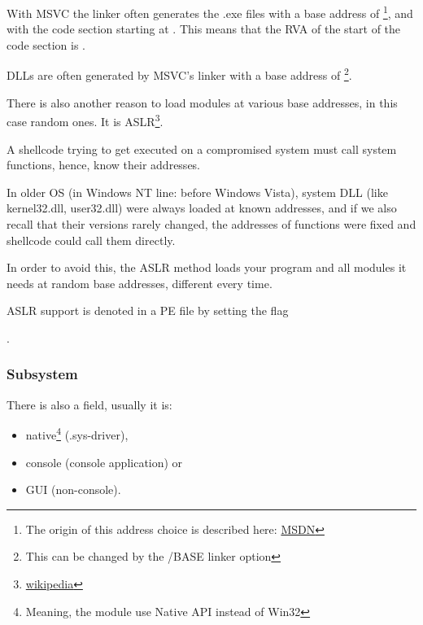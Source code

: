 \par With \ac{MSVC} the linker often generates the .exe files with a base address of 
\footnote{The origin of this address choice is described here: \href{http://go.yurichev.com/17041}{MSDN}},
and with the code section starting at .
This means that the \ac{RVA} of the start of the code section is .

DLLs are often generated by MSVC's linker with a base address of 
\footnote{This can be changed by the /BASE linker option}.


There is also another reason to load modules at various base addresses, in this case random ones.
It is \ac{ASLR}\footnote{\href{http://go.yurichev.com/17140}{wikipedia}}.


A shellcode trying to get executed on a compromised system must call system functions, hence, know their addresses.

In older \ac{OS} (in \gls{Windows NT} line: before Windows Vista),
system DLL (like kernel32.dll, user32.dll) were always loaded at known addresses, 
and if we also recall
that their versions rarely changed, the addresses of functions were
fixed and shellcode could call them directly.

In order to avoid this, the \ac{ASLR}
method loads your program and all modules it needs at random base addresses, different every time.

\ac{ASLR} support is denoted in a PE file by setting the flag
\par {} .

\subsubsection{Subsystem}

There is also a  field, usually it is:


\begin{itemize}
\item native\footnote{Meaning, the module use Native API instead of Win32} (.sys-driver), 

\item console (console application) or

\item \ac{GUI} (non-console).
\end{itemize}

